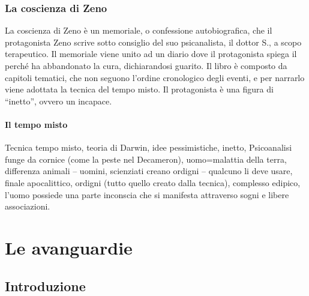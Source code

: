 \documentclass[10pt]{report}
\begin{document}
		\subsection{La coscienza di Zeno}
		La coscienza di Zeno è un memoriale, o confessione autobiografica, che il protagonista Zeno scrive sotto consiglio del suo psicanalista, il dottor S., a scopo terapeutico. Il memoriale viene unito ad un diario dove il protagonista spiega il perché ha abbandonato la cura, dichiarandosi guarito. Il libro è composto da capitoli tematici, che non seguono l’ordine cronologico degli eventi, e per narrarlo viene adottata la tecnica del tempo misto. Il protagonista è una figura di “inetto”, ovvero un incapace.
			\subsubsection{Il tempo misto}
			Tecnica tempo misto, teoria di Darwin, idee pessimistiche, inetto, Psicoanalisi funge da cornice (come la peste nel Decameron), uomo=malattia della terra, differenza animali – uomini, scienziati creano ordigni – qualcuno li deve usare, finale apocalittico, 
			ordigni (tutto quello creato dalla tecnica), complesso edipico, l’uomo possiede una parte inconscia che si manifesta attraverso sogni e libere associazioni.
	
	\chapter*{Le avanguardie}
		\section{Introduzione}
\end{document}

